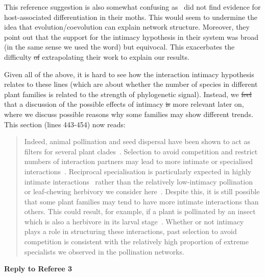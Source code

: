 \documentclass[12pt]{letter}
\providecommand{\DIFadd}[1]{{\protect\color{blue}\uwave{#1}}} %
\providecommand{\DIFdel}[1]{{\protect\color{red}\sout{#1}}}                      %
\providecommand{\DIFaddbegin}{} %
\providecommand{\DIFaddend}{} %
\providecommand{\DIFdelbegin}{} %
\providecommand{\DIFdelend}{} %
\newcommand{\DIFscaledelfig}{0.5}
\newlength{\DIFdelgraphicswidth} %
\newlength{\DIFdelgraphicsheight} %
\newcommand{\DIFaddincludegraphics}[2][]{{\color{blue}\fbox{\DIFOincludegraphics[#1]{#2}}}} %
\newcommand{\DIFdelincludegraphics}[2][]{%
\sbox{\DIFdelgraphicsbox}{\DIFOincludegraphics[#1]{#2}}%
\settoboxwidth{\DIFdelgraphicswidth}{\DIFdelgraphicsbox} %
\settoboxtotalheight{\DIFdelgraphicsheight}{\DIFdelgraphicsbox} %
\scalebox{\DIFscaledelfig}{%
\parbox[b]{\DIFdelgraphicswidth}{\usebox{\DIFdelgraphicsbox}\\[-\baselineskip] \rule{\DIFdelgraphicswidth}{0em}}\llap{\resizebox{\DIFdelgraphicswidth}{\DIFdelgraphicsheight}{%
\setlength{\unitlength}{\DIFdelgraphicswidth}%
\begin{picture}(1,1)%
\thicklines\linethickness{2pt} %
{\color[rgb]{1,0,0}\put(0,0){\framebox(1,1){}}}%
{\color[rgb]{1,0,0}\put(0,0){\line( 1,1){1}}}%
{\color[rgb]{1,0,0}\put(0,1){\line(1,-1){1}}}%
\end{picture}%
}\hspace*{3pt}}} %
} %
\DeclareRobustCommand{\DIFaddbegin}{\DIFOaddbegin \let\includegraphics\DIFaddincludegraphics} %
\DeclareRobustCommand{\DIFaddend}{\DIFOaddend \let\includegraphics\DIFOincludegraphics} %
\DeclareRobustCommand{\DIFdelbegin}{\DIFOdelbegin \let\includegraphics\DIFdelincludegraphics} %
\DeclareRobustCommand{\DIFdelend}{\DIFOaddend \let\includegraphics\DIFOincludegraphics} %
\begin{document}
		This reference suggestion is also somewhat confusing as~\citet{Hembry2018} did not find evidence for host-associated differentiation in their moths. This would seem to undermine the idea that evolution/coevolution can explain network structure. Moreover, they point out that the support for the intimacy hypothesis  in their system was broad (in the same sense we used the word) but equivocal. This exacerbates the difficulty \DIFdelbegin \DIFdel{of }\DIFdelend \DIFaddbegin \DIFadd{we found in }\DIFaddend extrapolating their work to explain our results.


		Given all of the above, it is hard to see how the interaction intimacy hypothesis relates to these lines (which are about whether the number of species in different plant families is related to the strength of phylogenetic signal). Instead, we \DIFdelbegin \DIFdel{feel }\DIFdelend \DIFaddbegin \DIFadd{felt }\DIFaddend that a discussion of the possible effects of intimacy \DIFdelbegin \DIFdel{is }\DIFdelend \DIFaddbegin \DIFadd{was }\DIFaddend more relevant later on, where we discuss possible reasons why some families may show different trends. This section (lines 443-454) now reads:


		\begin{quotation}

			Indeed, animal pollination and seed dispersal have been shown to act
			as filters for several plant clades~\citep{Mayfield2009}. Selection to avoid 
			competition and restrict numbers of interaction partners may lead to
			more intimate or specialised interactions~\citep{Ponisio2017}. 
			Reciprocal specialisation is particularly expected in highly intimate interactions~\citep{Hembry2018} rather than the relatively low-intimacy pollination or leaf-chewing herbivory we consider here~\citep{Astegiano2017}.
			Despite this, it is still possible that some plant families may tend to have more intimate interactions than others. This could result, for example, if a plant is pollinated by an insect which is also a herbivore in its larval stage~\citep{Hembry2018}. 
			Whether or not intimacy plays a role in structuring these interactions, past selection to avoid competition is 
			consistent with the relatively high proportion of extreme specialists we
			observed in the pollination networks.

		\end{quotation}


\clearpage

{\Large \bf Reply to Referee 3} 
\end{document}

